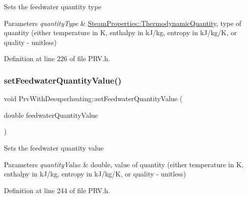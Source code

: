 Sets the feedwater quantity type


\begin{DoxyParams}{Parameters}
{\em quantity\+Type} & \hyperlink{class_steam_properties_ae0294bedf7d178c2d8fb6aed0f62fbff}{Steam\+Properties\+::\+Thermodynamic\+Quantity}, type of quantity (either temperature in K, enthalpy in k\+J/kg, entropy in k\+J/kg/K, or quality -\/ unitless) \\
\hline
\end{DoxyParams}


Definition at line 226 of file P\+R\+V.\+h.

\mbox{\label{class_prv_with_desuperheating_afc17940f7d61898eda1bb4a6f1fea8c3}} 
\subsubsection{\texorpdfstring{set\+Feedwater\+Quantity\+Value()}{setFeedwaterQuantityValue()}\hspace{0.1cm}{\footnotesize\ttfamily [1/3]}}
{\footnotesize\ttfamily void Prv\+With\+Desuperheating\+::set\+Feedwater\+Quantity\+Value (\begin{DoxyParamCaption}\item[{double}]{feedwater\+Quantity\+Value }\end{DoxyParamCaption})\hspace{0.3cm}{\ttfamily [inline]}}

Sets the feedwater quantity value


\begin{DoxyParams}{Parameters}
{\em quantity\+Value} & double, value of quantity (either temperature in K, enthalpy in k\+J/kg, entropy in k\+J/kg/K, or quality -\/ unitless) \\
\hline
\end{DoxyParams}


Definition at line 244 of file P\+R\+V.\+h.

\mbox{\label{class_prv_with_desuperheating_afc17940f7d61898eda1bb4a6f1fea8c3}} 

